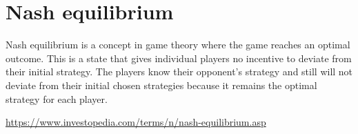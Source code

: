 \documentclass[]{article}
\begin{document}
\section{Nash equilibrium}
	Nash equilibrium is a concept in game theory where the game reaches an optimal outcome. This is a state that gives individual players no incentive to deviate from their initial strategy. The players know their opponent’s strategy and still will not deviate from their initial chosen strategies because it remains the optimal strategy for each player.

	\url{https://www.investopedia.com/terms/n/nash-equilibrium.asp}
\end{document}
